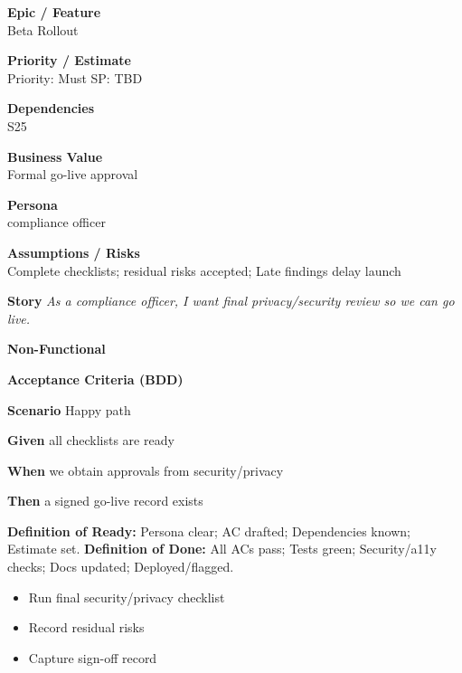\documentclass[11pt,a4paper]{article}
\newenvironment{StoryCard}[2][]{
  \begin{tcolorbox}[enhanced, breakable, sharp corners=all, colback=cardback, colframe=cardframe,
    title={#2}, fonttitle=\bfseries\large, boxrule=0.6pt, borderline west={2pt}{0pt}{accent}, #1]
}{
  \end{tcolorbox}
}
\newcommand{\badge}[1]{\pill{\footnotesize #1}}
\newcommand{\cb}{\(\square\)}
\newenvironment{TasksBox}[1][Tasks]{%
  \begin{tcolorbox}[enhanced,breakable,
    colback=cardback, colframe=cardframe, title={#1},
    borderline west={1.8pt}{0pt}{MidnightBlue},
    arc=2pt, boxrule=0.4pt,
    left=10pt,right=10pt,top=6pt,bottom=6pt,
    before skip=6pt, after skip=10pt
  ]
  \small
  \begin{itemize}[label=\cb, leftmargin=*, labelsep=0.6em, itemsep=4pt, topsep=2pt, parsep=0pt]
}{%
  \end{itemize}
  \end{tcolorbox}
}
\begin{document}
\begin{StoryCard}{S26 — Safety review \& sign-off}
\noindent\begin{minipage}[t]{0.49\textwidth}
\textbf{Epic / Feature}\\
Beta Rollout

\medskip
\textbf{Priority / Estimate}\\
Priority: Must \quad SP: TBD

\medskip
\textbf{Dependencies}\\
S25
\end{minipage}\hfill
\begin{minipage}[t]{0.49\textwidth}
\textbf{Business Value}\\
Formal go-live approval

\medskip
\textbf{Persona}\\
compliance officer

\medskip
\textbf{Assumptions / Risks}\\
Complete checklists; residual risks accepted; Late findings delay launch
\end{minipage}

\medskip
\textbf{Story} \emph{As a compliance officer, I want final privacy/security review so we can go live.}

\medskip
\textbf{Non-Functional}
\badge{Security}\ \badge{Privacy}

\medskip
\textbf{Acceptance Criteria (BDD)}\par
\textbf{Scenario} Happy path\par
\textbf{Given} all checklists are ready\par
\textbf{When} we obtain approvals from security/privacy\par
\textbf{Then} a signed go-live record exists\par
\medskip
\footnotesize \textbf{Definition of Ready:} Persona clear; AC drafted; Dependencies known; Estimate set.\quad
\textbf{Definition of Done:} All ACs pass; Tests green; Security/a11y checks; Docs updated; Deployed/flagged.
\end{StoryCard}

\begin{TasksBox}[Tasks]
  \item Run final security/privacy checklist
  \item Record residual risks
  \item Capture sign-off record
\end{TasksBox}
\clearpage
\end{document}
